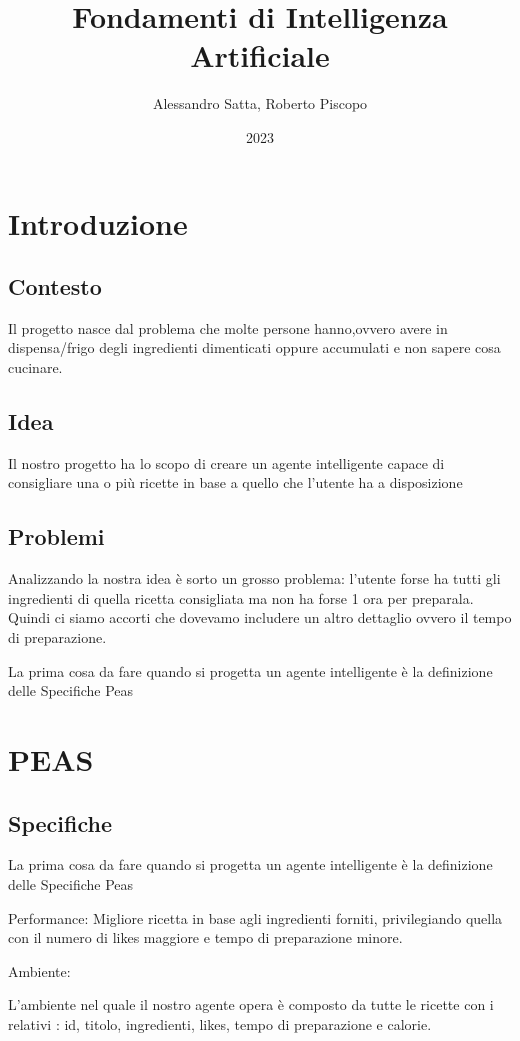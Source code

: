 \documentclass[12pt]{report}
\title{Fondamenti di Intelligenza Artificiale}
\author{Alessandro Satta, Roberto Piscopo}
\date{2023}
\begin{document}
\maketitle
\tableofcontents

\chapter{Introduzione}
\section{Contesto}    
Il progetto nasce dal problema che molte persone hanno,ovvero avere in dispensa/frigo degli ingredienti dimenticati oppure accumulati e non sapere cosa cucinare. 

\section{Idea}
Il nostro progetto ha lo scopo di creare un agente intelligente capace di consigliare una o più ricette in base a quello che l’utente ha a disposizione  

\section{Problemi}
Analizzando la nostra idea è sorto un grosso problema: l’utente forse ha tutti gli ingredienti di quella ricetta consigliata ma non ha forse 1 ora per preparala. Quindi ci siamo accorti che dovevamo includere un altro dettaglio ovvero il tempo di preparazione. 

La prima cosa da fare quando si progetta un agente intelligente è la definizione delle Specifiche Peas 

\chapter{PEAS}
\section{Specifiche}
La prima cosa da fare quando si progetta un agente intelligente è la definizione delle Specifiche Peas 

 Performance: Migliore ricetta in base agli ingredienti forniti, privilegiando quella con il numero di likes maggiore e tempo di preparazione minore. 

Ambiente:  

L’ambiente nel quale il nostro agente opera è composto da tutte le ricette con i relativi : id, titolo, ingredienti, likes, tempo di preparazione e calorie. 
\end{document}
